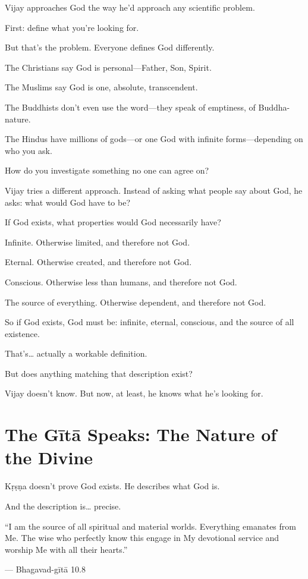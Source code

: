 \documentclass[11pt,twoside]{book}
\begin{document}
Vijay approaches God the way he'd approach any scientific problem.

First: define what you're looking for.

But that's the problem. Everyone defines God differently.

The Christians say God is personal—Father, Son, Spirit.

The Muslims say God is one, absolute, transcendent.

The Buddhists don't even use the word—they speak of emptiness, of Buddha-nature.

The Hindus have millions of gods—or one God with infinite forms—depending on who you ask.

How do you investigate something no one can agree on?

Vijay tries a different approach. Instead of asking what people say about God, he asks: what would God have to be?

If God exists, what properties would God necessarily have?

Infinite. Otherwise limited, and therefore not God.

Eternal. Otherwise created, and therefore not God.

Conscious. Otherwise less than humans, and therefore not God.

The source of everything. Otherwise dependent, and therefore not God.

So if God exists, God must be: infinite, eternal, conscious, and the source of all existence.

That's\ldots{} actually a workable definition.

But does anything matching that description exist?

Vijay doesn't know. But now, at least, he knows what he's looking for.

\section*{The Gītā Speaks: The Nature of the Divine}

Kṛṣṇa doesn't prove God exists. He describes what God is.

And the description is\ldots{} precise.

\begin{pullquote}
``I am the source of all spiritual and material worlds. Everything emanates from Me. The wise who perfectly know this engage in My devotional service and worship Me with all their hearts.''

--- Bhagavad-gītā 10.8
\end{pullquote}
\end{document}
